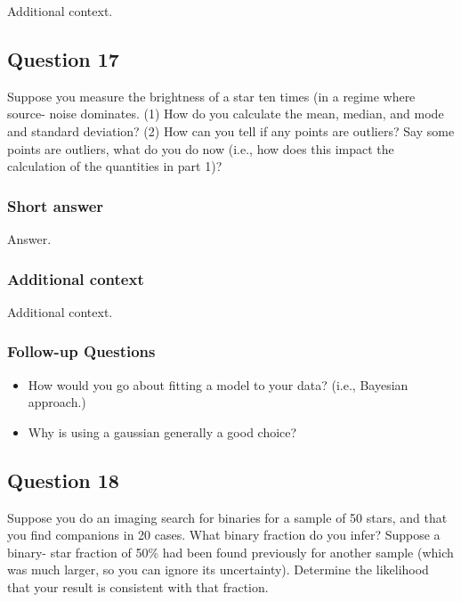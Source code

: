 \documentclass[a4paper,10pt]{article}
\begin{document}
Additional context.


\newpage
\subsection{Question 17}

Suppose you measure the brightness of a star ten times (in a regime where source- noise dominates. (1) How do you calculate the mean, median, and mode and standard deviation? (2) How can you tell if any points are outliers? Say some points are outliers, what do you do now (i.e., how does this impact the calculation of the quantities in part 1)?

\subsubsection{Short answer}

Answer.

\subsubsection{Additional context}

Additional context.

\subsubsection{Follow-up Questions}

\begin{itemize}
    \item How would you go about fitting a model to your data? (i.e., Bayesian approach.)
    \item Why is using a gaussian generally a good choice?
\end{itemize}


\newpage
\subsection{Question 18}

Suppose you do an imaging search for binaries for a sample of 50 stars, and that you find companions in 20 cases. What binary fraction do you infer? Suppose a binary- star fraction of 50\% had been found previously for another sample (which was much larger, so you can ignore its uncertainty). Determine the likelihood that your result is consistent with that fraction.
\end{document}
